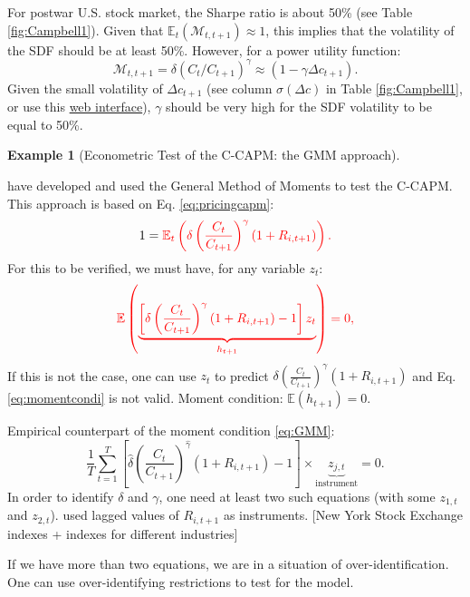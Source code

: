 \documentclass[
  12pt,
]{book}
\theoremstyle{definition}
\theoremstyle{definition}
\newtheorem{example}{Example}[chapter]
\theoremstyle{definition}
\theoremstyle{definition}
\theoremstyle{remark}
\begin{document}
For postwar U.S. stock market, the Sharpe ratio is about 50\% (see Table \ref{fig:Campbell1}). Given that \(\mathbb{E}_t(\mathcal{M}_{t,t+1}) \approx 1\), this implies that the volatility of the SDF should be at least 50\%.
However, for a power utility function:
\[
\mathcal{M}_{t,t+1}=\delta (C_t/C_{t+1})^\gamma \approx (1 - \gamma \Delta c_{t+1}).
\]
Given the small volatility of \(\Delta c_{t+1}\) (see column \(\sigma(\Delta c)\) in Table \ref{fig:Campbell1}, or use this \href{https://jrenne.shinyapps.io/APModels}{web interface}), \(\gamma\) should be very high for the SDF volatility to be equal to 50\%.

\begin{example}[Econometric Test of the C-CAPM: the GMM approach]
\protect\hypertarget{exm:GMM}{}\label{exm:GMM}

\citet{Hansen_Singleton_1982} have developed and used the General Method of Moments to test the C-CAPM. This approach is based on Eq. \eqref{eq:pricingcapm}:
\begin{equation}
1 = \color{red}{\mathbb{E}_t}\left( \delta \left(\frac{C_t}{C_{t+1}}\right)^\gamma (1+R_{i,t+1})\right).\label{eq:momentcondi}
\end{equation}
For this to be verified, we must have, for any variable \(z_t\):
\begin{equation}
\color{red}{\mathbb{E}}\left( \underbrace{\left[\delta \left(\frac{C_t}{C_{t+1}}\right)^\gamma (1+R_{i,t+1}) - 1\right] z_t}_{h_{t+1}}\right) = 0,\label{eq:GMM}
\end{equation}
If this is not the case, one can use \(z_t\) to predict \(\delta \left(\frac{C_t}{C_{t+1}}\right)^\gamma (1+R_{i,t+1})\) and Eq. \eqref{eq:momentcondi} is not valid. Moment condition: \(\mathbb{E}(h_{t+1})=0\).

Empirical counterpart of the moment condition \eqref{eq:GMM}:
\begin{equation}
\frac{1}{T}\sum_{t=1}^{T} \left[\hat\delta \left(\frac{C_t}{C_{t+1}}\right)^{\hat\gamma} (1+R_{i,t+1}) - 1\right] \times\underbrace{z_{j,t}}_{\mbox{instrument}} = 0.
\end{equation}
In order to identify \(\delta\) and \(\gamma\), one need at least two such equations (with some \(z_{1,t}\) and \(z_{2,t}\)). \citet{Hansen_Singleton_1982} used lagged values of \(R_{i,t+1}\) as instruments. {[}New York Stock Exchange indexes + indexes for different industries{]}

If we have more than two equations, we are in a situation of over-identification. One can use over-identifying restrictions to test for the model.


\end{example}
\end{document}
